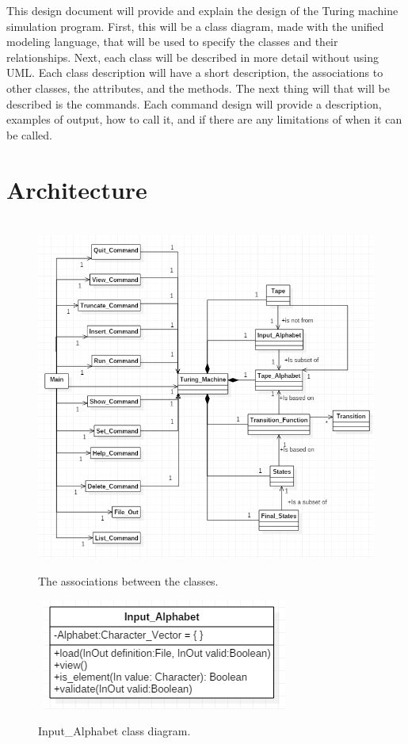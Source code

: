 \documentclass{report}
\begin{document}
    This design document will provide and explain the design of the Turing machine simulation program. First, this will be a class diagram, made with the unified modeling language, that will be used to specify the classes and their relationships. Next, each class will be described in more detail without using UML. Each class description will have a short description, the associations to other classes, the attributes, and the methods. 
    The next thing will that will be described is the commands. Each command design will provide a description, examples of output, how to call it, and if there are any limitations of when it can be called.
  
    

\chapter{Architecture}


\begin{figure}[!ht]
  	\centering
	\
    \includegraphics[width=1\textwidth]{UML_Overview.png}
  \caption{The associations between the classes.}
\end{figure}

\begin{figure}[!ht]
  	\centering
	\
    \includegraphics[scale=0.90]{Input_Alphabet.png}
  \caption{Input\_Alphabet class diagram.}
\end{figure}
\end{document}
